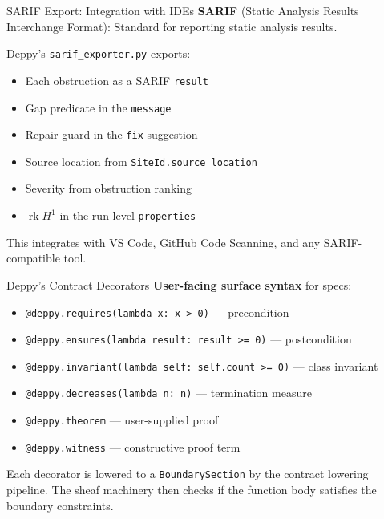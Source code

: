 \documentclass[aspectratio=169,10pt]{beamer}
\newcommand{\rk}{\operatorname{rk}}
\begin{document}
\begin{frame}{SARIF Export: Integration with IDEs}
\textbf{SARIF} (Static Analysis Results Interchange Format): Standard for reporting static analysis results.

\vspace{0.3em}
Deppy's \texttt{sarif\_exporter.py} exports:
\begin{itemize}
  \item Each obstruction as a SARIF \texttt{result}
  \item Gap predicate in the \texttt{message}
  \item Repair guard in the \texttt{fix} suggestion
  \item Source location from \texttt{SiteId.source\_location}
  \item Severity from obstruction ranking
  \item $\rk H^1$ in the run-level \texttt{properties}
\end{itemize}

\vspace{0.2em}
This integrates with VS Code, GitHub Code Scanning, and any SARIF-compatible tool.
\end{frame}

\begin{frame}{Deppy's Contract Decorators}
\textbf{User-facing surface syntax} for specs:

\vspace{0.3em}
\begin{itemize}
  \item \texttt{@deppy.requires(lambda x: x > 0)} --- precondition
  \item \texttt{@deppy.ensures(lambda result: result >= 0)} --- postcondition
  \item \texttt{@deppy.invariant(lambda self: self.count >= 0)} --- class invariant
  \item \texttt{@deppy.decreases(lambda n: n)} --- termination measure
  \item \texttt{@deppy.theorem} --- user-supplied proof
  \item \texttt{@deppy.witness} --- constructive proof term
\end{itemize}

\vspace{0.2em}
Each decorator is lowered to a \texttt{BoundarySection} by the contract lowering pipeline. The sheaf machinery then checks if the function body satisfies the boundary constraints.
\end{frame}
\end{document}
